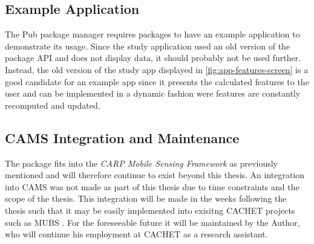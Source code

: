 \subsection{Example Application}
The Pub package manager requires packages to have an example application to demonstrate its usage. Since the study application used an old version of the package API and does not display data, it should probably not be used further. Instead, the old version of the study app displayed in \ref{fig:app-features-screen} is a good candidate for an example app since it presents the calculated features to the user and can be implemented in a dynamic fashion were features are constantly recomputed and updated.

\subsection{CAMS Integration and Maintenance}
The package fits into the \textit{CARP Mobile Sensing Framework} as previously mentioned and will therefore continue to exist beyond this thesis. An integration into CAMS was not made as part of this thesis due to time constraints and the scope of the thesis. This integration will be made in the weeks following the thesis such that it may be easily implemented into exisitng CACHET projects such as MUBS \cite{mubs-rohani}. For the foreseeable future it will be maintained by the Author, who will continue his employment at CACHET as a research assistant. 